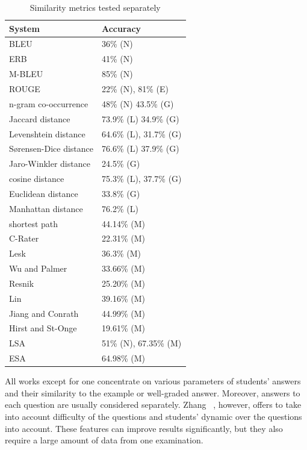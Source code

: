 \begin{table}[h!]
\centering
\caption{Similarity metrics tested separately}
\label{sim}
\begin{tabular}{|l|l|}
\hline
 System &  Accuracy \\ \hline
 BLEU & 36\% (N) \\ \hline
 ERB & 41\% (N)  \\ \hline 
 M-BLEU  & 85\% (N) \\ \hline
 ROUGE & 22\% (N), 81\% (E) \\ \hline
 n-gram co-occurrence & 48\% (N) 43.5\% (G) \\ \hline
 Jaccard distance & 73.9\% (L) 34.9\% (G) \\ \hline
 Levenshtein distance & 64.6\% (L), 31.7\% (G) \\ \hline
 S{\o}rensen-Dice distance & 76.6\% (L) 37.9\% (G) \\ \hline
 Jaro-Winkler distance & 24.5\% (G) \\ \hline
 cosine distance & 75.3\% (L), 37.7\% (G) \\ \hline
 Euclidean distance & 33.8\% (G) \\ \hline
 Manhattan distance & 76.2\% (L) \\ \hline
 shortest path & 44.14\% (M) \\ \hline
 C-Rater & 22.31\% (M) \\ \hline
 Lesk & 36.3\% (M) \\ \hline
 Wu and Palmer & 33.66\% (M) \\ \hline
 Resnik & 25.20\% (M) \\ \hline
 Lin & 39.16\% (M) \\ \hline
 Jiang and Conrath & 44.99\% (M) \\ \hline
 Hirst and St-Onge & 19.61\% (M) \\ \hline
 LSA & 51\% (N), 67.35\% (M) \\ \hline
 ESA & 64.98\% (M) \\ \hline
\end{tabular}
\end{table}

All works except for one concentrate on various parameters of students' answers and their similarity to the example or well-graded answer. Moreover, answers to each question are usually considered separately. Zhang ~\cite{Zhang}, however, offers to take into account difficulty of the questions and students' dynamic over the questions into account. These features can improve results significantly, but they also require a large amount of data from one examination.\\

